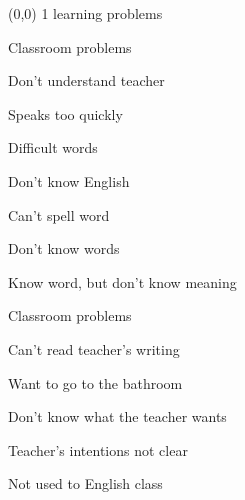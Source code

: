 \documentclass[b5paper]{article}
\newcommand{\mycard}[5]{%
	\small #1 #2
	\par
	\parbox{7.5cm}{%
	\Large#3\\
	\normalsize#4 #5
	}
}
\begin{document}
\selectfont

\begin{textblock}{8}(0,0)
\mycard{1}{learning problems}{Classroom problems}{
\begin{description}
	\item Don't understand teacher 
	\begin{description}
		\item Speaks too quickly
		\item Difficult words
	\end{description}
	\item Don't know English
	\begin{description}
		\item Can't spell word
		\item Don't know words
		\item Know word, but don't know meaning
	\end{description}
	\item Classroom problems
	\begin{description}
		\item Can't read teacher's writing
		\item Want to go to the bathroom
	\end{description}
	\item Don't know what the teacher wants
	\begin{description}
		\item Teacher's intentions not clear
		\item Not used to English class
	\end{description}
\end{description}
}{}
\end{textblock}
\end{document}
